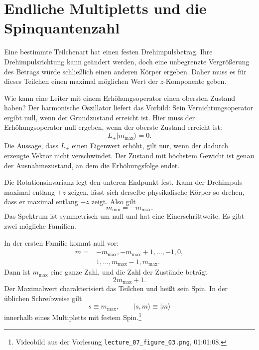 \section{Endliche Multipletts und die Spinquantenzahl}

Eine bestimmte Teilchenart hat einen festen Drehimpulsbetrag. Ihre Drehimpulsrichtung kann geändert werden, doch eine unbegrenzte Vergrößerung des Betrags würde schließlich einen anderen Körper ergeben. Daher muss es für dieses Teilchen einen maximal möglichen Wert der \(z\)-Komponente geben.

Wie kann eine Leiter mit einem Erhöhungsoperator einen obersten Zustand haben? Der harmonische Oszillator liefert das Vorbild: Sein Vernichtungsoperator ergibt null, wenn der Grundzustand erreicht ist. Hier muss der Erhöhungsoperator null ergeben, wenn der oberste Zustand erreicht ist:
\begin{equation}
L_+\lvert m_{\max}\rangle=0.
\end{equation}
Die Aussage, dass \(L_+\) einen Eigenwert erhöht, gilt nur, wenn der dadurch erzeugte Vektor nicht verschwindet. Der Zustand mit höchstem Gewicht ist genau der Ausnahmezustand, an dem die Erhöhungsfolge endet.

Die Rotationsinvarianz legt den unteren Endpunkt fest. Kann der Drehimpuls maximal entlang \(+z\) zeigen, lässt sich derselbe physikalische Körper so drehen, dass er maximal entlang \(-z\) zeigt. Also gilt
\begin{equation}
m_{\min}=-m_{\max}.
\end{equation}
Das Spektrum ist symmetrisch um null und hat eine Einerschrittweite. Es gibt zwei mögliche Familien.

In der ersten Familie kommt null vor:
\begin{equation}
\begin{aligned}
m={}&-m_{\max},-m_{\max}+1,\ldots,-1,0,\\
&1,\ldots,m_{\max}-1,m_{\max}.
\end{aligned}
\end{equation}
Dann ist \(m_{\max}\) eine ganze Zahl, und die Zahl der Zustände beträgt
\begin{equation}
2m_{\max}+1.
\end{equation}
Der Maximalwert charakterisiert das Teilchen und heißt sein Spin. In der üblichen Schreibweise gilt
\begin{equation}
s\equiv m_{\max},
\qquad
\lvert s,m\rangle\equiv\lvert m\rangle
\end{equation}
innerhalb eines Multipletts mit festem Spin.\footnote{\raggedright Videobild aus der Vorlesung \nolinkurl{lecture_07_figure_03.png}, 01:01:08.\par}

